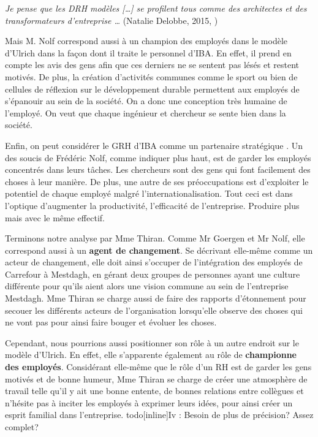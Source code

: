 \og{} \textit{Je pense que les DRH modèles [\ldots] se profilent tous comme 
des architectes et des transformateurs d’entreprise \ldots} \fg{} (Natalie Delobbe, 2015, \cite{tableronde}) \newline

Mais M. Nolf correspond aussi à un \og champion des employés \fg{} dans le modèle d'Ulrich dans la façon dont il traite le personnel d'IBA. En effet, il prend en compte les avis des gens afin que ces derniers ne se sentent pas lésés et restent motivés. De plus, la création d'activités communes comme le sport ou bien de cellules de réflexion sur le développement durable permettent aux employés de s'épanouir au sein de la société. On a donc une conception très humaine de l'employé. On veut que chaque ingénieur et chercheur se sente bien dans la société. \newline

Enfin, on peut considérer le GRH d'IBA comme un \og partenaire stratégique \fg{}. Un des soucis de Frédéric Nolf, comme indiquer plus haut, est de garder les employés concentrés dans leurs tâches. Les chercheurs sont des gens qui font facilement des choses à leur manière. De plus, une autre de ses préoccupations est d'exploiter le potentiel de chaque employé malgré l'internationalisation. Tout ceci est dans l'optique d'augmenter la productivité, l'efficacité de l'entreprise. Produire plus mais avec le même effectif. 

Terminons notre analyse par Mme Thiran. Comme Mr Goergen et Mr Nolf, elle correspond aussi à un \textbf{agent de changement}. Se décrivant elle-même comme un acteur de changement, elle doit ainsi s’occuper de l’intégration des employés de Carrefour à Mestdagh, en gérant deux groupes de personnes ayant une culture différente pour qu’ils aient alors une vision commune au sein de l'entreprise Mestdagh. Mme Thiran se charge aussi de faire des rapports d’étonnement pour secouer les différents acteurs de l’organisation lorsqu’elle observe des choses qui ne vont pas pour ainsi faire bouger et évoluer les choses. 

Cependant, nous pourrions aussi positionner son rôle à un autre endroit sur le modèle d’Ulrich. En effet, elle s’apparente également au rôle de \textbf{championne des employés}. Considérant elle-même que le rôle d’un RH est de garder les gens motivés et de bonne humeur, Mme Thiran se charge de créer une atmosphère de travail telle qu’il y ait une bonne entente, de bonnes relations entre collègues et n’hésite pas à inciter les employés à exprimer leurs idées, pour ainsi créer un esprit familial dans l’entreprise. 
todo[inline]{Iv : Besoin de plus de précision? Assez complet?}

